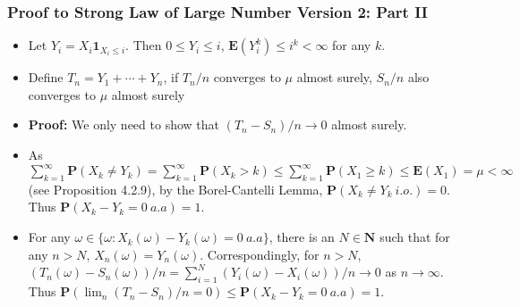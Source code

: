 \documentclass[handout]{beamer}
\newcommand{\BP}{\mathbf{P}}
\newcommand{\BE}{\mathbf{E}}
\newcommand{\BI}{\mathbf{1}}
\begin{document}
\frame
{
  \frametitle{Proof to Strong Law of Large Number Version 2: Part II}

   \begin{itemize}
   \item<1-> Let $Y_i=X_i \BI_{X_i\leq i}$. Then $0\leq Y_i \leq i$, $\BE(Y_i^k) \leq i^k< \infty$ for any $k$.
   
    \item<2->[]\begin{Lemma} Define $T_n=Y_1+\cdots+Y_n$, if $T_n/n$ converges to $\mu$ almost surely, $S_n/n$ also converges to $\mu$ almost surely \end{Lemma} 
    
    \item<3-> \textbf{Proof:} We only need to show that $(T_n-S_n)/n \rightarrow 0$ almost surely. 
    
         \item<4->[-]  As $\sum_{k=1}^{\infty} \BP(X_k\neq Y_k)=\sum_{k=1}^{\infty} \BP (X_k>k) \leq \sum_{k=1}^{\infty} \BP (X_1\geq k)\leq \BE(X_1)=\mu<\infty$ (see Proposition 4.2.9), by the Borel-Cantelli Lemma, $\BP(X_k\neq Y_k\ i.o.)=0$. Thus $\BP(X_k-Y_k=0\ a.a)=1$.
         
         \item<5->[-]   For any $\omega\in \{\omega: X_k(\omega)-Y_k(\omega)=0\ a.a \}$, there is an $N \in \mathbf{N}$ such that for any $n>N$, $X_n(\omega)=Y_n(\omega)$. Correspondingly, for $n>N$, $(T_n(\omega)-S_n(\omega))/n=\sum_{i=1}^N (Y_i(\omega)-X_i (\omega) )/n \rightarrow 0$ as $n\rightarrow \infty$.  Thus $\BP (\lim_n (T_n-S_n)/n=0)\leq \BP(X_k-Y_k=0\ a.a)=1$.
                                      
\end{itemize}
}
\end{document}
